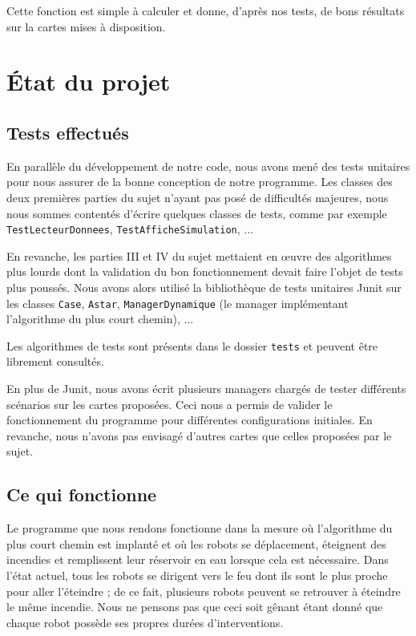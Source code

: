 \documentclass[a4paper,11pt]{article}
\begin{document}
Cette fonction est simple à calculer et donne, d'après nos tests, de bons résultats sur la cartes mises à disposition.

\section{État du projet}
\subsection{Tests effectués}
En parallèle du développement de notre code, nous avons mené des tests unitaires pour nous assurer de la bonne conception de notre programme. Les classes des deux premières parties du sujet n'ayant pas posé de difficultés majeures, nous nous sommes contentés d'écrire quelques classes de tests, comme par exemple \texttt{TestLecteurDonnees}, \texttt{TestAfficheSimulation}, ...

En revanche, les parties III et IV du sujet mettaient en \oe uvre des algorithmes plus lourds dont la validation du bon fonctionnement devait faire l'objet de tests plus poussés. Nous avons alors utilisé la bibliothèque de tests unitaires Junit sur les classes \texttt{Case}, \texttt{Astar}, \texttt{ManagerDynamique} (le manager implémentant l'algorithme du plus court chemin), ...

Les algorithmes de tests sont présents dans le dossier \texttt{tests} et peuvent être librement consultés.

\vspace{\baselineskip}
En plus de Junit, nous avons écrit plusieurs managers chargés de tester différents scénarios sur les cartes proposées. Ceci nous a permis de valider le fonctionnement du programme pour différentes configurations initiales. En revanche, nous n'avons pas envisagé d'autres cartes que celles proposées par le sujet.

\subsection{Ce qui fonctionne}
Le programme que nous rendons fonctionne dans la mesure où l'algorithme du plus court chemin est implanté et où les robots se déplacement, éteignent des incendies et remplissent leur réservoir en eau lorsque cela est nécessaire. Dans l'état actuel, tous les robots se dirigent vers le feu dont ils sont le plus proche pour aller l'éteindre ; de ce fait, plusieurs robots peuvent se retrouver à éteindre le même incendie. Nous ne pensons pas que ceci soit gênant étant donné que chaque robot possède ses propres durées d'interventions.
\end{document}
